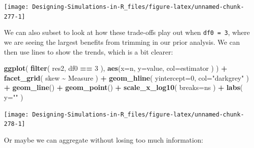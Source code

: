 \documentclass[
]{book}
\newenvironment{Shaded}{\begin{snugshade}}{\end{snugshade}}
\newcommand{\AttributeTok}[1]{\textcolor[rgb]{0.13,0.29,0.53}{#1}}
\newcommand{\DecValTok}[1]{\textcolor[rgb]{0.00,0.00,0.81}{#1}}
\newcommand{\FunctionTok}[1]{\textcolor[rgb]{0.13,0.29,0.53}{\textbf{#1}}}
\newcommand{\NormalTok}[1]{#1}
\newcommand{\SpecialCharTok}[1]{\textcolor[rgb]{0.81,0.36,0.00}{\textbf{#1}}}
\newcommand{\StringTok}[1]{\textcolor[rgb]{0.31,0.60,0.02}{#1}}
\begin{document}
\begin{center}\texttt{[image: Designing-Simulations-in-R\_files/figure-latex/unnamed-chunk-277-1]} \end{center}

We can also subset to look at how these trade-offs play out when \texttt{df0\ =\ 3}, where we are seeing the largest benefits from trimming in our prior analysis.
We can then use lines to show the trends, which is a bit clearer:

\begin{Shaded}
\begin{Highlighting}[]
\FunctionTok{ggplot}\NormalTok{( }\FunctionTok{filter}\NormalTok{( res2, df0 }\SpecialCharTok{==} \DecValTok{3}\NormalTok{ ), }
        \FunctionTok{aes}\NormalTok{(}\AttributeTok{x=}\NormalTok{n, }\AttributeTok{y=}\NormalTok{value, }\AttributeTok{col=}\NormalTok{estimator ) ) }\SpecialCharTok{+}
    \FunctionTok{facet\_grid}\NormalTok{( skew }\SpecialCharTok{\textasciitilde{}}\NormalTok{ Measure ) }\SpecialCharTok{+}
    \FunctionTok{geom\_hline}\NormalTok{( }\AttributeTok{yintercept=}\DecValTok{0}\NormalTok{, }\AttributeTok{col=}\StringTok{"darkgrey"}\NormalTok{ ) }\SpecialCharTok{+}
    \FunctionTok{geom\_line}\NormalTok{() }\SpecialCharTok{+} \FunctionTok{geom\_point}\NormalTok{() }\SpecialCharTok{+}
    \FunctionTok{scale\_x\_log10}\NormalTok{( }\AttributeTok{breaks=}\NormalTok{ns ) }\SpecialCharTok{+}
    \FunctionTok{labs}\NormalTok{( }\AttributeTok{y=}\StringTok{""}\NormalTok{ )}
\end{Highlighting}
\end{Shaded}

\begin{center}\texttt{[image: Designing-Simulations-in-R\_files/figure-latex/unnamed-chunk-278-1]} \end{center}

Or maybe we can aggregate without losing too much information:
\end{document}
